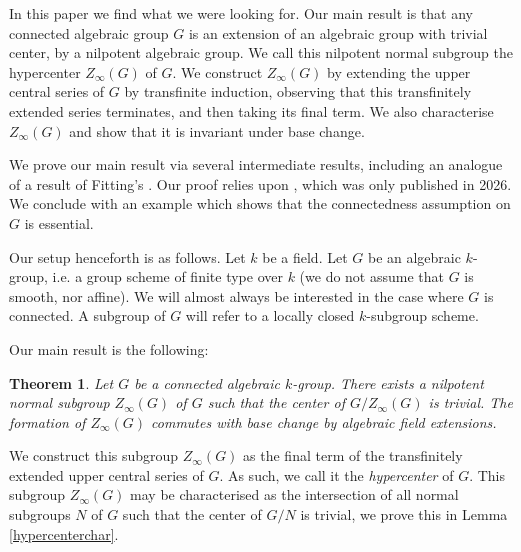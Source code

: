 \documentclass[twoside,a4paper,reqno,11pt]{amsart}
\newtheorem{theorem}{Theorem}[section]
\theoremstyle{definition}
\begin{document}
\vspace{2mm}\noindent In this paper we find what we were looking for. Our main result is that any connected algebraic group $G$ is an extension of an algebraic group with trivial center, by a nilpotent algebraic group. We call this nilpotent normal subgroup the hypercenter $Z_\infty(G)$ of $G$. We construct $Z_\infty(G)$ by extending the upper central series of $G$ by transfinite induction, observing that this transfinitely extended series terminates, and then taking its final term. %
We also characterise $Z_\infty(G)$ and show that it is invariant under base change.

\vspace{2mm}\noindent We prove our main result via several intermediate results, including an analogue of a result of Fitting's \cite[Thm.\ 14]{Fi}. Our proof relies upon \cite[Thm.\ 1.1]{S}, which was only published in 2026. We conclude with an example which shows that the connectedness assumption on $G$ is essential.

\vspace{2mm}\noindent Our setup henceforth is as follows. Let $k$ be a field. %
Let $G$ be an algebraic $k$-group, i.e. a group scheme of finite type over $k$ (we do not assume that $G$ is smooth, nor affine). We will almost always be interested in the case where $G$ is connected. A subgroup of $G$ will refer to a locally closed $k$-subgroup scheme.

\vspace{2mm}\noindent Our main result is the following:

\begin{theorem}\label{centerlessbynilpotent} Let $G$ be a connected algebraic $k$-group. There exists a nilpotent normal subgroup $Z_\infty(G)$ of $G$ such that the center of $G/Z_\infty(G)$ is trivial. The formation of $Z_\infty(G)$ commutes with base change by algebraic field extensions.
\end{theorem}

\noindent We construct this subgroup $Z_\infty(G)$ as the final term of the transfinitely extended upper central series of $G$. As such, we call it the \textit{hypercenter} of $G$. This subgroup $Z_\infty(G)$ may be characterised as the intersection of all normal subgroups $N$ of $G$ such that the center of $G/N$ is trivial, we prove this in Lemma \ref{hypercenterchar}.
\end{document}
